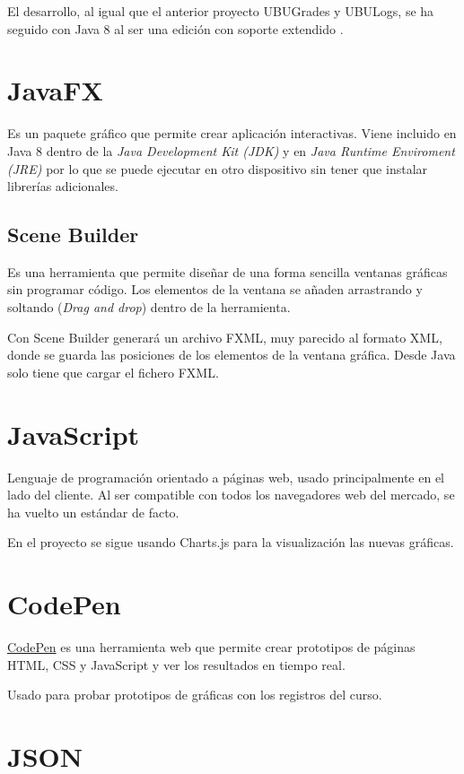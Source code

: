 El desarrollo, al igual que el anterior proyecto UBUGrades y UBULogs, se ha seguido con Java 8 al ser una edición con soporte extendido \cite{noauthor_oracle_nodate}.

\section{JavaFX}
Es un paquete gráfico que permite crear aplicación interactivas. Viene incluido en Java 8 dentro de la \textit{Java Development Kit (JDK)} y en \textit{Java Runtime Enviroment (JRE)} por lo que se puede ejecutar en otro dispositivo sin tener que instalar librerías adicionales.

\subsection{Scene Builder}
Es una herramienta que permite diseñar de una forma sencilla ventanas gráficas sin programar código. Los elementos de la ventana se añaden arrastrando y soltando (\textit{Drag and drop}) dentro de la herramienta.


Con Scene Builder generará un archivo FXML, muy parecido al formato XML, donde se guarda las posiciones de los elementos de la ventana gráfica. Desde Java solo tiene que cargar el fichero FXML.

\section{JavaScript}
Lenguaje de programación orientado a páginas web, usado principalmente en el lado del cliente. Al ser compatible con todos los navegadores web del mercado, se ha vuelto un estándar de facto.

En el proyecto se sigue usando Charts.js para la visualización las nuevas gráficas.

\section{CodePen}
\href{https://codepen.io}{CodePen} es una herramienta web que permite crear prototipos de páginas HTML, CSS y JavaScript y ver los resultados en tiempo real.

Usado para probar prototipos de gráficas con los registros del curso.

\section{JSON}

